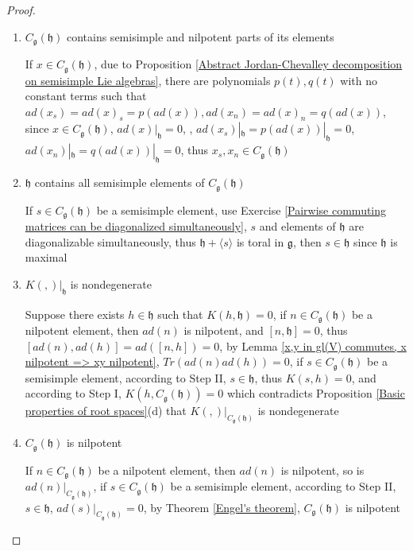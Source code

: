 \documentclass[main]{subfiles}
\begin{document}
\begin{proof} \hfill
\begin{enumerate}[leftmargin=*,label=\textit{Step \Roman*:}]
\item $C_{\mathfrak{g}}(\mathfrak{h})$ contains semisimple and nilpotent parts of its elements \par
If $x\in C_{\mathfrak{g}}(\mathfrak{h})$, due to Proposition \ref{Abstract Jordan-Chevalley decomposition on semisimple Lie algebras}, there are polynomials $p(t),q(t)$ with no constant terms such that $ad(x_s)=ad(x)_s=p(ad(x)),ad(x_n)=ad(x)_n=q(ad(x))$, since $x\in C_{\mathfrak{g}}(\mathfrak{h})$, $ad(x)|_{\mathfrak{h}}=0$, , $ad(x_s)|_{\mathfrak{h}}=p(ad(x))|_{\mathfrak{h}}=0$, $ad(x_n)|_{\mathfrak{h}}=q(ad(x))|_{\mathfrak{h}}=0$, thus $x_s,x_n\in C_{\mathfrak{g}}(\mathfrak{h})$ 
\item $\mathfrak{h}$ contains all semisimple elements of $C_{\mathfrak{g}}(\mathfrak{h})$ \par
If $s\in C_{\mathfrak{g}}(\mathfrak{h})$ be a semisimple element, use Exercise \ref{Pairwise commuting matrices can be diagonalized simultaneously}, $s$ and elements of $\mathfrak{h}$ are diagonalizable simultaneously, thus $\mathfrak{h}+\langle s\rangle$ is toral in $\mathfrak{g}$, then $s\in\mathfrak{h}$ since $\mathfrak{h}$ is maximal
\item $K(,)|_\mathfrak{h}$ is nondegenerate \par
Suppose there exists $h\in\mathfrak{h}$ such that $K(h,\mathfrak{h})=0$, if $n\in C_{\mathfrak{g}}(\mathfrak{h})$ be a nilpotent element, then $ad(n)$ is nilpotent, and $[n,\mathfrak{h}]=0$, thus $[ad(n),ad(h)]=ad([n,h])=0$, by Lemma \ref{x,y in gl(V) commutes, x nilpotent => xy nilpotent}, $Tr(ad(n)ad(h))=0$, if $s\in C_{\mathfrak{g}}(\mathfrak{h})$ be a semisimple element, according to Step II, $s\in\mathfrak{h}$, thus $K(s,h)=0$, and according to Step I, $K(h,C_{\mathfrak{g}}(\mathfrak{h}))=0$ which contradicts Proposition \ref{Basic properties of root spaces}(d) that $K(,)|_{C_{\mathfrak{g}}(\mathfrak{h})}$ is nondegenerate
\item $C_{\mathfrak{g}}(\mathfrak{h})$ is nilpotent \par
If $n\in C_{\mathfrak{g}}(\mathfrak{h})$ be a nilpotent element, then $ad(n)$ is nilpotent, so is $ad(n)|_{C_{\mathfrak{g}}(\mathfrak{h})}$, if $s\in C_{\mathfrak{g}}(\mathfrak{h})$ be a semisimple element, according to Step II, $s\in\mathfrak{h}$, $ad(s)|_{C_{\mathfrak{g}}(\mathfrak{h})}=0$, by Theorem \ref{Engel's theorem}, $C_{\mathfrak{g}}(\mathfrak{h})$ is nilpotent

\end{enumerate}
\end{proof}
\end{document}
